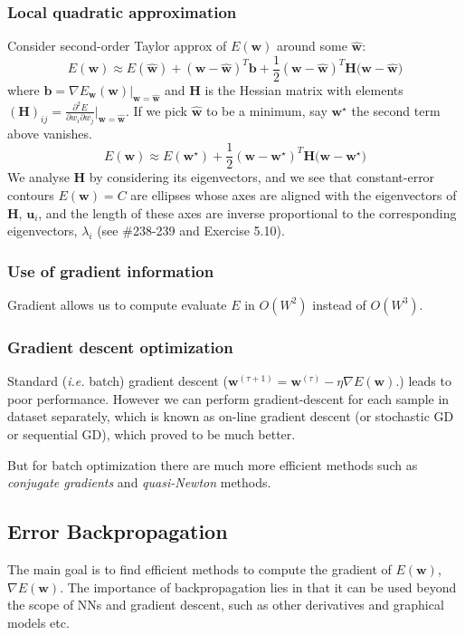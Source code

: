 \documentclass[a4paper]{article}
\newcommand{\ie}{\textit{i.e. }}
\newcommand{\mb}{\mathbf}
\begin{document}
\subsubsection{Local quadratic approximation}
Consider second-order Taylor approx of $E(\mb{w})$ around some $\mb{\widehat{w}}$:
%
\begin{equation}
E(\mb{w})\approx E(\mb{\widehat{w}})+(\mb{w-\widehat{w}})^T\mb{b}+\frac{1}{2}(\mb{w-\widehat{w}})^T \mb{H} \mb{(w-\widehat{w}})
\end{equation}
%
where $\mb{b}=\nabla E_{\mb{w}}(\mb{w})|_{\mb{w=\widehat{w}}}$ and $\mb{H}$ is the Hessian matrix with elements $(\mb{H})_{ij}=\frac{\partial^2 E}{\partial w_i\partial w_j}|_{\mb{w=\widehat{w}}}$. If we pick $\mb{\widehat{w}}$ to be a minimum, say $\mb{w}^{\star}$ the second term above vanishes.
%
\begin{equation}
E(\mb{w})\approx E(\mb{{w}^{\star}})+\frac{1}{2}(\mb{w-{w}^{\star}})^T \mb{H} \mb{(w-{w}^{\star}})
\end{equation}
%
We analyse $\mb{H}$ by considering its eigenvectors, and we see that constant-error contours $E(\mb{w})=C$ are ellipses whose axes are aligned with the eigenvectors of $\mb{H}$, $\mb{u}_i$, and the length of these axes are inverse proportional to the corresponding eigenvectors, $\lambda_i$ (see \#238-239 and Exercise 5.10).

\subsubsection{Use of gradient information}
Gradient allows us to compute evaluate $E$ in $O(W^2)$ instead of $O(W^3)$.

\subsubsection{Gradient descent optimization}
Standard (\ie batch) gradient descent ($\mb{w}^{(\tau+1)}=\mb{w}^{(\tau)}-\eta \nabla E(\mb{w}).$) leads to poor performance. However we can perform gradient-descent for each sample in dataset separately, which is known as on-line gradient descent (or stochastic GD or sequential GD), which proved to be much better.  

But for batch optimization there are much more efficient methods such as \textit{conjugate gradients} and \textit{quasi-Newton} methods.

\subsection{Error Backpropagation}
The main goal is to find efficient methods to compute the gradient of $E(\mb{w})$, $\nabla E(\mb{w})$. The importance of backpropagation lies in that it can be used beyond the scope of NNs and gradient descent, such as other derivatives and graphical models etc.
\end{document}
